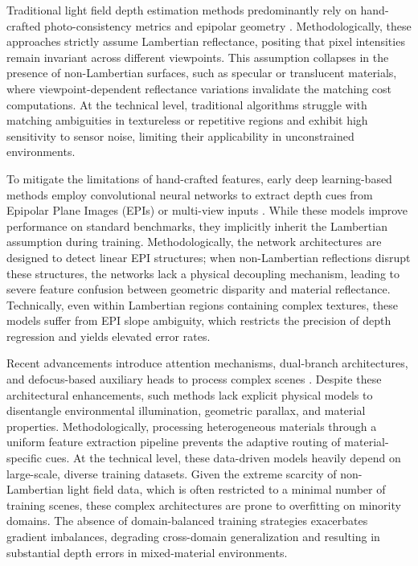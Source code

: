 Traditional light field depth estimation methods predominantly rely on hand-crafted photo-consistency metrics and epipolar geometry . Methodologically, these approaches strictly assume Lambertian reflectance, positing that pixel intensities remain invariant across different viewpoints. This assumption collapses in the presence of non-Lambertian surfaces, such as specular or translucent materials, where viewpoint-dependent reflectance variations invalidate the matching cost computations. At the technical level, traditional algorithms struggle with matching ambiguities in textureless or repetitive regions and exhibit high sensitivity to sensor noise, limiting their applicability in unconstrained environments.

To mitigate the limitations of hand-crafted features, early deep learning-based methods employ convolutional neural networks to extract depth cues from Epipolar Plane Images (EPIs) or multi-view inputs . While these models improve performance on standard benchmarks, they implicitly inherit the Lambertian assumption during training. Methodologically, the network architectures are designed to detect linear EPI structures; when non-Lambertian reflections disrupt these structures, the networks lack a physical decoupling mechanism, leading to severe feature confusion between geometric disparity and material reflectance. Technically, even within Lambertian regions containing complex textures, these models suffer from EPI slope ambiguity, which restricts the precision of depth regression and yields elevated error rates.

Recent advancements introduce attention mechanisms, dual-branch architectures, and defocus-based auxiliary heads to process complex scenes . Despite these architectural enhancements, such methods lack explicit physical models to disentangle environmental illumination, geometric parallax, and material properties. Methodologically, processing heterogeneous materials through a uniform feature extraction pipeline prevents the adaptive routing of material-specific cues. At the technical level, these data-driven models heavily depend on large-scale, diverse training datasets. Given the extreme scarcity of non-Lambertian light field data, which is often restricted to a minimal number of training scenes, these complex architectures are prone to overfitting on minority domains. The absence of domain-balanced training strategies exacerbates gradient imbalances, degrading cross-domain generalization and resulting in substantial depth errors in mixed-material environments.

